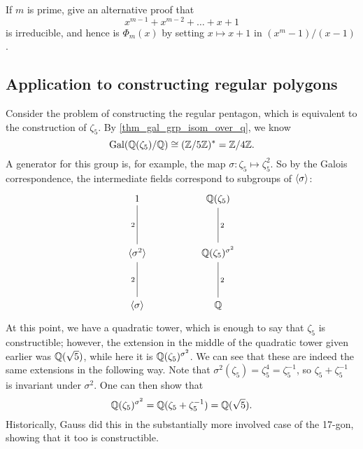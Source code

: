 \begin{exercise}
    If $m$ is prime, give an alternative proof that
    \[
        x^{m - 1} + x^{m - 2} + \ldots + x + 1
    \]
    is irreducible, and hence is $\Phi_m(x)$ by setting $x \mapsto x + 1$ in $(x^m - 1)/(x - 1)$.
\end{exercise}

\subsection{Application to constructing regular polygons}
\label{subsect_constr_reg_polys}

Consider the problem of constructing the regular pentagon, which is equivalent to the construction of $\zeta_5$. By \cref{thm_gal_grp_isom_over_q}, we know
\[
    \operatorname{Gal}(\mathbb{{Q}}(\zeta_5)/\mathbb{{Q}}) \cong (\mathbb{{Z}}/{{5}}\mathbb{{Z}})^* = \mathbb{{Z}}/{{4}}\mathbb{{Z}}.
\]
A generator for this group is, for example, the map $\sigma: \zeta_5 \mapsto \zeta_5^2$. So by the Galois correspondence, the intermediate fields correspond to subgroups of $\langle {\sigma} \rangle$:
\[
    \begin{tikzcd}
    	1 && {\mathbb{Q}(\zeta_5)} \\
    	\\
    	{\langle \sigma^2 \rangle} && {\mathbb{Q}(\zeta_5)^{\sigma^2}} \\
    	\\
    	{\langle \sigma \rangle} && {\mathbb{Q}}
    	\arrow["2"', no head, from=1-1, to=3-1]
    	\arrow["2"', no head, from=3-1, to=5-1]
    	\arrow["2", no head, from=1-3, to=3-3]
    	\arrow["2", no head, from=3-3, to=5-3]
    \end{tikzcd}
\]
At this point, we have a quadratic tower, which is enough to say that $\zeta_5$ is constructible; however, the extension in the middle of the quadratic tower given earlier was $\mathbb{{Q}}(\sqrt{5})$, while here it is $\mathbb{{Q}}(\zeta_5)^{\sigma^2}$. We can see that these are indeed the same extensions in the following way. Note that $\sigma^2(\zeta_5) = \zeta_5^{4} = \zeta_5^{-1}$, so $\zeta_5 + \zeta_5^{-1}$ is invariant under $\sigma^2$. One can then show that
\[
    \mathbb{{Q}}(\zeta_5)^{\sigma^2} = \mathbb{{Q}}(\zeta_5 + \zeta_5^{-1}) = \mathbb{{Q}}(\sqrt{5}).
\]
Historically, Gauss did this in the substantially more involved case of the 17-gon, showing that it too is constructible.
